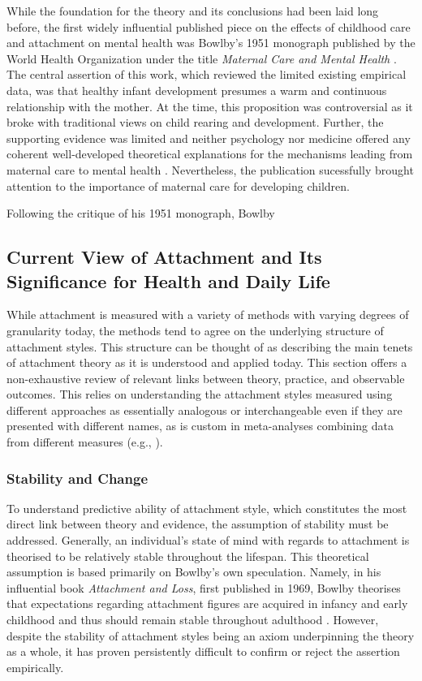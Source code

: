 \documentclass[12pt]{report}
\begin{document}
While the foundation for the theory and its conclusions had been laid long before, the first widely influential published piece on the effects of childhood care and attachment on mental health was Bowlby's 1951 monograph published by the World Health Organization under the title \textit{Maternal Care and Mental Health} \cite{bowlby1951WHO}. The central assertion of this work, which reviewed the limited existing empirical data, was that healthy infant development presumes a warm and continuous relationship with the mother. At the time, this proposition was controversial as it broke with traditional views on child rearing and development. Further, the supporting evidence was limited and neither psychology nor medicine offered any coherent well-developed theoretical explanations for the mechanisms leading from maternal care to mental health \cite{Bowlby1988, who1962deprivation}. Nevertheless, the publication sucessfully brought attention to the importance of maternal care for developing children.

Following the critique of his 1951 monograph, Bowlby 

\subsection{Current View of Attachment and Its Significance for Health and Daily Life}
While attachment is measured with a variety of methods with varying degrees of granularity today, the methods tend to agree on the underlying structure of attachment styles. This structure can be thought of as describing the main tenets of attachment theory as it is understood and applied today. This section offers a non-exhaustive review of relevant links between theory, practice, and observable outcomes. This relies on understanding the attachment styles measured using different approaches as essentially analogous or interchangeable even if they are presented with different names, as is custom in meta-analyses combining data from different measures (e.g., \cite{McConnell2011,Pinquart2013}).

\subsubsection{Stability and Change}
To understand predictive ability of attachment style, which constitutes the most direct link between theory and evidence, the assumption of stability must be addressed. Generally, an individual's state of mind with regards to attachment is theorised to be relatively stable throughout the lifespan. This theoretical assumption is based primarily on Bowlby's own speculation. Namely, in his influential book \textit{Attachment and Loss}, first published in 1969, Bowlby theorises that expectations regarding attachment figures are acquired in infancy and early childhood and thus should remain stable throughout adulthood \cite{bowlby1982attachment}. However, despite the stability of attachment styles being an axiom underpinning the theory as a whole, it has proven persistently difficult to confirm or reject the assertion empirically.
\end{document}
